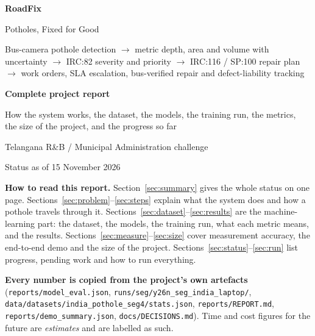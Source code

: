 \documentclass[11pt,a4paper]{article}
\newcommand{\code}[1]{\texttt{\small #1}}
\begin{document}
\begin{titlepage}
  \centering
  \vspace*{2.2cm}
  {\Huge\bfseries\color{gmblue} RoadFix\par}
  \vspace{4mm}
  {\Large Potholes, Fixed for Good\par}
  \vspace{10mm}
  {\large Bus-camera pothole detection $\rightarrow$ metric depth, area and volume with uncertainty
   $\rightarrow$ IRC:82 severity and priority $\rightarrow$ IRC:116 / SP:100 repair plan $\rightarrow$
   work orders, SLA escalation, bus-verified repair and defect-liability tracking\par}
  \vspace{14mm}
  {\Large\bfseries Complete project report\par}
  \vspace{3mm}
  {\large How the system works, the dataset, the models, the training run, the metrics, \\
   the size of the project, and the progress so far\par}
  \vspace{12mm}
  {\large Telangana R\&B / Municipal Administration challenge\par}
  \vspace{4mm}
  {\large Status as of 15 November 2026\par}
  \vfill
  \begin{minipage}{0.88\textwidth}\small
  \textbf{How to read this report.} Section~\ref{sec:summary} gives the whole status on one page.
  Sections~\ref{sec:problem}--\ref{sec:steps} explain what the system does and how a pothole travels through it.
  Sections~\ref{sec:dataset}--\ref{sec:results} are the machine-learning part: the dataset, the models, the training
  run, what each metric means, and the results. Sections~\ref{sec:measure}--\ref{sec:size} cover measurement
  accuracy, the end-to-end demo and the size of the project. Sections~\ref{sec:status}--\ref{sec:run} list progress,
  pending work and how to run everything.

  \textbf{Every number is copied from the project's own artefacts} (\code{reports/model\_eval.json},
  \code{runs/seg/y26n\_seg\_india\_laptop/}, \code{data/datasets/india\_pothole\_seg4/stats.json},
  \code{reports/REPORT.md}, \code{reports/demo\_summary.json}, \code{docs/DECISIONS.md}). Time and cost figures for
  the future are \emph{estimates} and are labelled as such.
  \end{minipage}
\end{titlepage}
\end{document}
